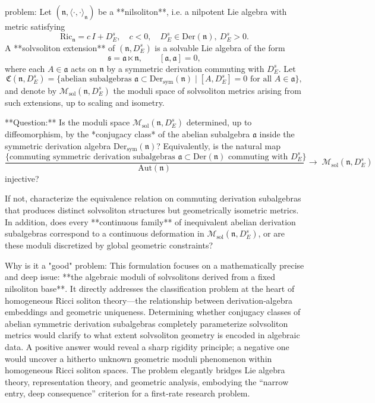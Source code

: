 problem:  
Let \((\mathfrak n, \langle\cdot,\cdot\rangle_{\mathfrak n})\) be a **nilsoliton**, i.e. a nilpotent Lie algebra with metric satisfying  
\[
\mathrm{Ric}_{\mathfrak n} = c\, I + D_E^s, \quad c<0, \quad D_E^s\in \mathrm{Der}(\mathfrak n),\ D_E^s>0.
\]
A **solvsoliton extension** of \((\mathfrak n, D_E^s)\) is a solvable Lie algebra of the form  
\[
\mathfrak s = \mathfrak a \ltimes \mathfrak n, \qquad [\mathfrak a,\mathfrak a]=0,
\]
where each \(A\in \mathfrak a\) acts on \(\mathfrak n\) by a symmetric derivation commuting with \(D_E^s\).  
Let  
\[
\mathfrak C(\mathfrak n, D_E^s)
= 
\{\text{abelian subalgebras } \mathfrak a \subset \mathrm{Der}_{\mathrm{sym}}(\mathfrak n)
\mid [A,D_E^s]=0 \text{ for all } A\in \mathfrak a\},
\]
and denote by \(\mathcal{M}_{\mathrm{sol}}(\mathfrak n, D_E^s)\) the moduli space of solvsoliton metrics arising from such extensions, up to scaling and isometry.

**Question:**  
Is the moduli space \(\mathcal{M}_{\mathrm{sol}}(\mathfrak n, D_E^s)\) determined, up to diffeomorphism, by the *conjugacy class* of the abelian subalgebra \(\mathfrak a\) inside the symmetric derivation algebra \(\mathrm{Der}_{\mathrm{sym}}(\mathfrak n)\)?  
Equivalently, is the natural map  
\[
\frac{
   \{\text{commuting symmetric derivation subalgebras } \mathfrak a \subset \mathrm{Der}(\mathfrak n)\text{ commuting with }D_E^s\}
}{
   \mathrm{Aut}(\mathfrak n)
}
\;\longrightarrow\;
\mathcal{M}_{\mathrm{sol}}(\mathfrak n, D_E^s)
\]
injective?  

If not, characterize the equivalence relation on commuting derivation subalgebras that produces distinct solvsoliton structures but geometrically isometric metrics.  
In addition, does every **continuous family** of inequivalent abelian derivation subalgebras correspond to a continuous deformation in \(\mathcal{M}_{\mathrm{sol}}(\mathfrak n, D_E^s)\), or are these moduli discretized by global geometric constraints?  

Why is it a "good" problem:  
This formulation focuses on a mathematically precise and deep issue: **the algebraic moduli of solvsolitons derived from a fixed nilsoliton base**. It directly addresses the classification problem at the heart of homogeneous Ricci soliton theory—the relationship between derivation‑algebra embeddings and geometric uniqueness. Determining whether conjugacy classes of abelian symmetric derivation subalgebras completely parameterize solvsoliton metrics would clarify to what extent solvsoliton geometry is encoded in algebraic data. A positive answer would reveal a sharp rigidity principle; a negative one would uncover a hitherto unknown geometric moduli phenomenon within homogeneous Ricci soliton spaces. The problem elegantly bridges Lie algebra theory, representation theory, and geometric analysis, embodying the “narrow entry, deep consequence” criterion for a first‑rate research problem.